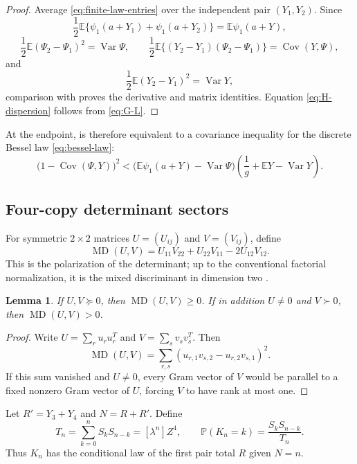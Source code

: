 \documentclass[11pt,a4paper]{amsart}
\numberwithin{equation}{section}
\theoremstyle{plain}
\newtheorem{lemma}[theorem]{Lemma}
\theoremstyle{definition}
\newcommand{\E}{\mathbb E}
\newcommand{\MD}{\operatorname{MD}}
\begin{document}
\begin{proof}
Average \eqref{eq:finite-law-entries} over the independent pair
\((Y_1,Y_2)\).  Since
\[
 \frac12\E\{\psi_1(a+Y_1)+\psi_1(a+Y_2)\}=\E\psi_1(a+Y),
\]
\[
 \frac12\E(\Psi_2-\Psi_1)^2=\operatorname{Var}\Psi,
 \qquad
 \frac12\E\{(Y_2-Y_1)(\Psi_2-\Psi_1)\}
 =\operatorname{Cov}(Y,\Psi),
\]
and
\[
 \frac12\E(Y_2-Y_1)^2=\operatorname{Var}Y,
\]
comparison with  proves the derivative and matrix
identities.  Equation \eqref{eq:H-dispersion} follows from
\eqref{eq:G-L}.
\end{proof}

At the endpoint,  is therefore equivalent to a covariance
inequality for the discrete Bessel law \eqref{eq:bessel-law}:
\begin{equation}\label{eq:covariance-ineq}
 \bigl(1-\operatorname{Cov}(\Psi,Y)\bigr)^2
 <\bigl(\E\psi_1(a+Y)-\operatorname{Var}\Psi\bigr)
 \left(\frac1g+\E Y-\operatorname{Var}Y\right).
\end{equation}

\subsection{Four-copy determinant sectors}\label{subsec:four-copy}

For symmetric \(2\times2\) matrices \(U=(U_{ij})\) and \(V=(V_{ij})\), define
\[
 \MD(U,V)=U_{11}V_{22}+U_{22}V_{11}-2U_{12}V_{12}.
\]
This is the polarization of the determinant; up to the conventional factorial
normalization, it is the mixed discriminant in dimension two
\cite{Bapat1989MixedDiscriminants}.

\begin{lemma}\label{lem:MD-positive}
If \(U,V\succeq0\), then \(\MD(U,V)\ge0\).  If in addition \(U\ne0\) and
\(V\succ0\), then \(\MD(U,V)>0\).
\end{lemma}

\begin{proof}
Write \(U=\sum_r u_ru_r^T\) and \(V=\sum_s v_sv_s^T\).  Then
\[
 \MD(U,V)=\sum_{r,s}
 \left(u_{r,1}v_{s,2}-u_{r,2}v_{s,1}\right)^2.
\]
If this sum vanished and \(U\ne0\), every Gram vector of \(V\) would be
parallel to a fixed nonzero Gram vector of \(U\), forcing \(V\) to have rank
at most one.
\end{proof}

Let \(R'=Y_3+Y_4\) and \(N=R+R'\).  Define
\begin{equation}\label{eq:Tn-Kn-law}
 T_n=\sum_{k=0}^nS_kS_{n-k}=[\lambda^n]Z^4,
 \qquad
 \mathbb P(K_n=k)=\frac{S_kS_{n-k}}{T_n}.
\end{equation}
Thus \(K_n\) has the conditional law of the first pair total \(R\) given
\(N=n\).
\end{document}
